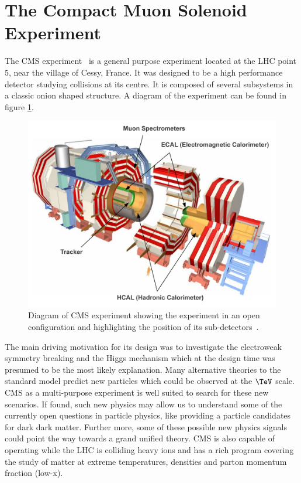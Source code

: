 \section{The Compact Muon Solenoid Experiment}
\label{SECTION:ExperimentalApparatus_CMS}


The \acrfull{CMS} experiment~\cite{ARTICLE:TheCMSExperiment} is a general purpose experiment located at the \gls{LHC} point 5, near the village of Cessy, France. It was designed to be a high performance detector studying collisions at its centre. It is composed of several subsystems in a classic onion shaped structure. A diagram of the experiment can be found in figure \ref{FIGURE:ExperimentalApparatus_CMS_Layout_Diagram}.

\begin{figure}[!htb]
  \centering
  \includegraphics[width=1.00\textwidth]{Chapter02/CMS/Images/CMS_Layout_Diagram.pdf}
  \caption{Diagram of \gls{CMS} experiment showing the experiment in an open configuration and highlighting the position of its sub-detectors~\cite{IMAGEREF:CERNPublic_CMSDiagram}.}
  \label{FIGURE:ExperimentalApparatus_CMS_Layout_Diagram}
\end{figure}

The main driving motivation for its design was to investigate the electroweak symmetry breaking and the Higgs mechanism which at the design time was presumed to be the most likely explanation. Many alternative theories to the standard model predict new particles which could be observed at the $\TeV$ scale. \gls{CMS} as a multi-purpose experiment is well suited to search for these new scenarios. If found, such new physics may allow us to understand some of the currently open questions in particle physics, like providing a particle candidates for dark dark matter. Further more, some of these possible new physics signals could point the way towards a grand unified theory. \gls{CMS} is also capable of operating while the \gls{LHC} is colliding heavy ions and has a rich program covering the study of matter at extreme temperatures, densities and parton momentum fraction (low-x).

